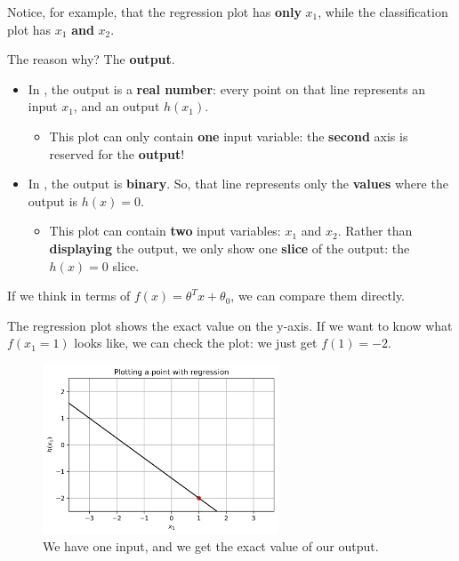    Notice, for example, that the regression plot has \textbf{only} $x_1$, while the classification plot has $x_1$ \textbf{and} $x_2$.
    
    The reason why? The \textbf{output}.
    
    \begin{itemize}
        \item In , the output is a \textbf{real number}: every point on that line represents an input $x_1$, and an output $h(x_1)$.
            
            \begin{itemize}
                \item This plot can only contain \textbf{one} input variable: the \textbf{second} axis is reserved for the \textbf{output}!
            \end{itemize}
        
        \item In , the output is \textbf{binary}. So, that line represents only the \textbf{values} where the output is $h(x)=0$. 
            \begin{itemize}
                \item This plot can contain \textbf{two} input variables: $x_1$ and $x_2$. Rather than \textbf{displaying} the output, we only show one \textbf{slice} of the output: the $h(x)=0$ slice.
            \end{itemize}
    \end{itemize}
    
    If we think in terms of $f(x) = \theta^Tx +\theta_0$, we can compare them directly.
    
    The regression plot shows the exact value on the y-axis. If we want to know what $f(x_1=1)$ looks like, we can check the plot: we just get $f(1)=-2$.
    
    \begin{figure}[H]
        \centering
        
        \includegraphics[width=70mm,scale=0.5]{images/classification_images/2d_regression_plot.png}
        \caption*{We have one input, and we get the exact value of our output.}
    \end{figure}
    
